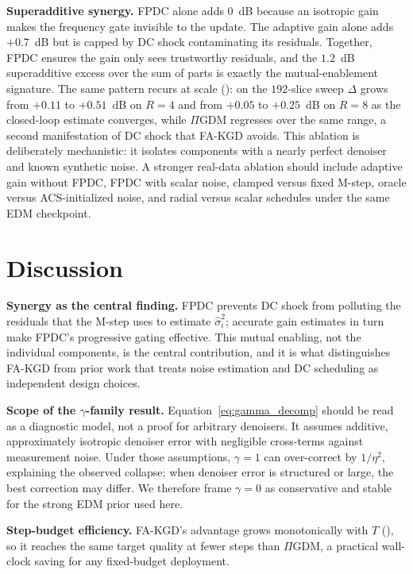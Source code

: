 \documentclass[10pt,twocolumn,letterpaper]{article}
\newcommand{\hatsig}{\hat{\sigma}}
\newcommand{\PIGDM}{$\Pi$GDM}
\begin{document}
\textbf{Superadditive synergy.} FPDC alone adds $0$~dB because an isotropic
gain makes the frequency gate invisible to the update. The adaptive gain
alone adds $+0.7$~dB but is capped by DC shock contaminating its residuals.
Together, FPDC ensures the gain only sees trustworthy residuals, and the
$1.2$~dB superadditive excess over the sum of parts is exactly the
mutual-enablement signature. The same pattern recurs at scale
(): on the $192$-slice sweep $\Delta$ grows from
$+0.11$ to $+0.51$~dB on $R{=}4$ and from $+0.05$ to $+0.25$~dB on
$R{=}8$ as the closed-loop estimate converges, while \PIGDM{} regresses
over the same range, a second manifestation of DC shock that FA-KGD
avoids.
This ablation is deliberately mechanistic: it isolates components with a nearly
perfect denoiser and known synthetic noise. A stronger real-data ablation should
include adaptive gain without FPDC, FPDC with scalar noise, clamped versus fixed
M-step, oracle versus ACS-initialized noise, and radial versus scalar schedules
under the same EDM checkpoint.

\section{Discussion}
\label{sec:discussion}

\textbf{Synergy as the central finding.} FPDC prevents DC shock from
polluting the residuals that the M-step uses to estimate $\hatsig_i^2$;
accurate gain estimates in turn make FPDC's progressive gating effective.
This mutual enabling, not the individual components, is the central
contribution, and it is what distinguishes FA-KGD from prior work that treats
noise estimation and DC scheduling as independent design choices.

\textbf{Scope of the $\gamma$-family result.}
Equation~\eqref{eq:gamma_decomp} should be read as a diagnostic model, not a
proof for arbitrary denoisers. It assumes additive, approximately isotropic
denoiser error with negligible cross-terms against measurement noise. Under
those assumptions, $\gamma{=}1$ can over-correct by $1/\eta^2$, explaining the
observed collapse; when denoiser error is structured or large, the best
correction may differ. We therefore frame $\gamma{=}0$ as conservative and
stable for the strong EDM prior used here.

\textbf{Step-budget efficiency.} FA-KGD's advantage grows monotonically
with $T$ (), so it reaches the same target quality at
fewer steps than $\Pi$GDM, a practical wall-clock saving for any
fixed-budget deployment.
\end{document}

